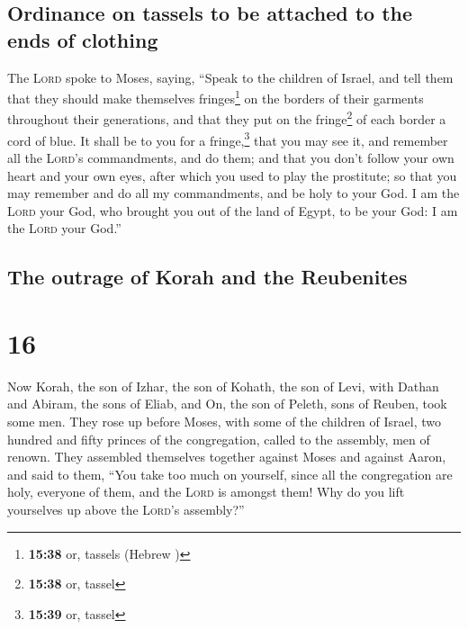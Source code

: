 \hypertarget{ordinance-on-tassels-to-be-attached-to-the-ends-of-clothing}{%
\subsection{Ordinance on tassels to be attached to the ends of
clothing}\label{ordinance-on-tassels-to-be-attached-to-the-ends-of-clothing}}

 The \textsc{Lord} spoke to Moses, saying,
 ``Speak to the children of Israel, and tell them that
they should make themselves fringes\footnote{\textbf{15:38} or, tassels
  (Hebrew )} on the borders of their garments throughout
their generations, and that they put on the fringe\footnote{\textbf{15:38}
  or, tassel} of each border a cord of blue.  It shall be
to you for a fringe,\footnote{\textbf{15:39} or, tassel} that you may
see it, and remember all the \textsc{Lord}'s commandments, and do them;
and that you don't follow your own heart and your own eyes, after which
you used to play the prostitute;  so that you may
remember and do all my commandments, and be holy to your God.
 I am the \textsc{Lord} your God, who brought you out of
the land of Egypt, to be your God: I am the \textsc{Lord} your God.''

\hypertarget{the-outrage-of-korah-and-the-reubenites}{%
\subsection{The outrage of Korah and the
Reubenites}\label{the-outrage-of-korah-and-the-reubenites}}

\hypertarget{section-15}{%
\section{16}\label{section-15}}

 Now Korah, the son of Izhar, the son of Kohath, the son
of Levi, with Dathan and Abiram, the sons of Eliab, and On, the son of
Peleth, sons of Reuben, took some men.  They rose up
before Moses, with some of the children of Israel, two hundred and fifty
princes of the congregation, called to the assembly, men of renown.
 They assembled themselves together against Moses and
against Aaron, and said to them, ``You take too much on yourself, since
all the congregation are holy, everyone of them, and the \textsc{Lord}
is amongst them! Why do you lift yourselves up above the \textsc{Lord}'s
assembly?''

